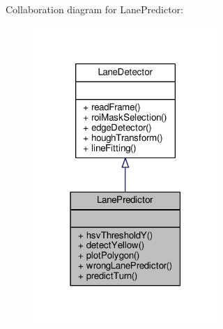 Collaboration diagram for Lane\+Predictor\+:
\nopagebreak
\begin{figure}[H]
\begin{center}
\leavevmode
\includegraphics[width=198pt]{classLanePredictor__coll__graph}
\end{center}
\end{figure}
